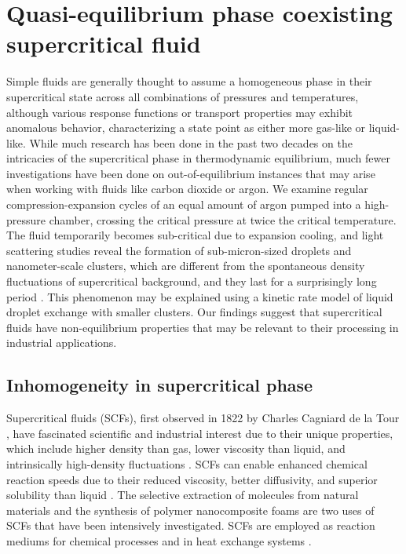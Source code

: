 
\chapter{Quasi-equilibrium phase coexisting supercritical fluid}
\label{sec:ch2}

Simple fluids are generally thought to assume a homogeneous phase in their supercritical state across all combinations of pressures and temperatures, although various response functions or transport properties may exhibit anomalous behavior, characterizing a state point as either more gas-like or liquid-like. While much research has been done in the past two decades on the intricacies of the supercritical phase in thermodynamic equilibrium, much fewer investigations have been done on out-of-equilibrium instances that may arise when working with fluids like carbon dioxide or argon. We examine regular compression-expansion cycles of an equal amount of argon pumped into a high-pressure chamber, crossing the critical pressure at twice the critical temperature. The fluid temporarily becomes sub-critical due to expansion cooling, and light scattering studies reveal the formation of sub-micron-sized droplets and nanometer-scale clusters, which are different from the spontaneous density fluctuations of supercritical background, and they last for a surprisingly long period \cite{lee2021quasi}. This phenomenon may be explained using a kinetic rate model of liquid droplet exchange with smaller clusters. Our findings suggest that supercritical fluids have non-equilibrium properties that may be relevant to their processing in industrial applications.



\section{Inhomogeneity in supercritical phase}
\label{sec:ch2-1}

Supercritical fluids (SCFs), first observed in 1822 by Charles Cagniard de la Tour \cite{berche2009critical}, have fascinated scientific and industrial interest due to their unique properties, which include higher density than gas, lower viscosity than liquid, and intrinsically high-density fluctuations \cite{knez2014industrial, stauss2015review}. SCFs can enable enhanced chemical reaction speeds due to their reduced viscosity, better diffusivity, and superior solubility than liquid \cite{medina2012determination}. The selective extraction of molecules from natural materials \cite{sovova2012steps} and the synthesis of polymer nanocomposite foams \cite{lee2005polymer, matson1987rapid} are two uses of SCFs that have been intensively investigated. SCFs are employed as reaction mediums for chemical processes \cite{munshi2009supercritical} and in heat exchange systems \cite{duffey2005experimental}.


